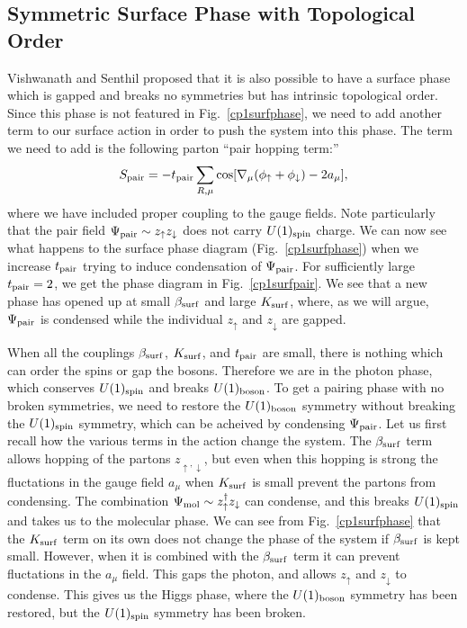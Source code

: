 \subsection{Symmetric Surface Phase with Topological Order}
Vishwanath and Senthil proposed that it is also possible to have a surface phase which is gapped and breaks no symmetries but has intrinsic topological order.\cite{SenthilVishwanath} Since this phase is not featured in Fig.~\ref{cp1surfphase}, we need to add another term to our surface action in order to push the system into this phase. The term we need to add is the following parton ``pair hopping term:''\cite{SenthilVishwanath, Max}
\begin{equation}
S_{\rm pair} = -t_{\rm pair}\sum_{R,\mu} \cos[\nabla_\mu (\phi_\uparrow + \phi_\downarrow) - 2 a_\mu],
\label{pairing}
\end{equation}
where we have included proper coupling to the gauge fields.  Note particularly that the pair field $\Psi_{\rm pair} \sim z_\uparrow z_\downarrow$ does not carry $U(1)_{\rm spin}$ charge. 
We can now see what happens to the surface phase diagram (Fig.~\ref{cp1surfphase}) when we increase $t_{\rm pair}$ trying to induce condensation of $\Psi_{\rm pair}$.  For sufficiently large $t_{\rm pair}=2$, we get the phase diagram in Fig.~\ref{cp1surfpair}.  We see that a new phase has opened up at small $\beta_{\rm surf}$ and large $K_{\rm surf}$, where, as we will argue, $\Psi_{\rm pair}$ is condensed while the individual $z_\uparrow$ and $z_\downarrow$ are gapped.

When all the couplings $\beta_{\rm surf}$, $K_{\rm surf}$, and $t_{\rm pair}$ are small, there is nothing which can order the spins or gap the bosons. Therefore we are in the photon phase, which conserves $U(1)_{\rm spin}$ and breaks $U(1)_{\rm boson}$. To get a pairing phase with no broken symmetries, we need to restore the $U(1)_{\rm boson}$ symmetry without breaking the $U(1)_{\rm spin}$ symmetry, which can be acheived by condensing $\Psi_{\rm pair}$.  Let us first recall how the various terms in the action change the system.  The $\beta_{\rm surf}$ term allows hopping of the partons $z_{\uparrow,\downarrow}$, but even when this hopping is strong the fluctations in the gauge field $a_\mu$ when $K_{\rm surf}$ is small prevent the partons from condensing. The combination $\Psi_{\rm mol}\sim z_\uparrow^\dagger z_\downarrow$ can condense, and this breaks $U(1)_{\rm spin}$ and takes us to the molecular phase.
We can see from Fig.~\ref{cp1surfphase} that the $K_{\rm surf}$ term on its own does not change the phase of the system if $\beta_{\rm surf}$ is kept small. However, when it is combined with the $\beta_{\rm surf}$ term it can prevent fluctations in the $a_\mu$ field. This gaps the photon, and allows $z_\uparrow$ and $z_\downarrow$ to condense. This gives us the Higgs phase, where the $U(1)_{\rm boson}$ symmetry has been restored, but the $U(1)_{\rm spin}$ symmetry has been broken.

